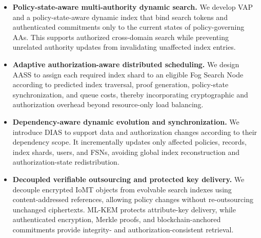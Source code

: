 \documentclass{ieeetj}
\theoremstyle{ieee-style}
\begin{document}
\begin{itemize}

\item \textbf{Policy-state-aware multi-authority dynamic search.}
We develop VAP and a policy-state-aware dynamic index that bind search
tokens and authenticated commitments only to the current states of
policy-governing AAs. This supports authorized cross-domain search while
preventing unrelated authority updates from invalidating unaffected index
entries.

\item \textbf{Adaptive authorization-aware distributed scheduling.}
We design AASS to assign each required index shard to an eligible Fog
Search Node according to predicted index traversal, proof generation,
policy-state synchronization, and queue costs, thereby incorporating
cryptographic and authorization overhead beyond resource-only load
balancing.

\item \textbf{Dependency-aware dynamic evolution and synchronization.}
We introduce DIAS to support data and authorization changes according to
their dependency scope. It incrementally updates only affected policies,
records, index shards, users, and FSNs, avoiding global index
reconstruction and authorization-state redistribution.

\item \textbf{Decoupled verifiable outsourcing and protected key delivery.}
We decouple encrypted IoMT objects from evolvable search indexes using
content-addressed references, allowing policy changes without
re-outsourcing unchanged ciphertexts. ML-KEM protects attribute-key
delivery, while authenticated encryption, Merkle proofs, and
blockchain-anchored commitments provide integrity- and
authorization-consistent retrieval.

\end{itemize}
\end{document}
